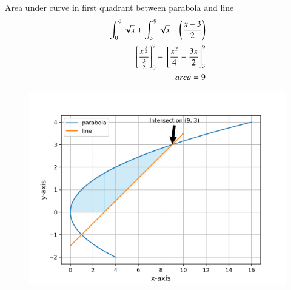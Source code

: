 \documentclass[a5paper,10pt]{article}
\begin{document}
Area under curve in first quadrant between parabola and line
\begin{align}
    \int_0^{3}\sqrt{x}+\int_3^{9}\sqrt{x}-\left(\frac{x-3}{2}\right)\\
    {}\left[\frac{x^{\frac{3}{2}}}{\frac{3}{2}}\right]^9_0-{}\left[\frac{x^2}{4}-\frac{3x}{2}\right]^9_3\\
    area=9
\end{align}
\begin{figure}[H]
    \centering
    \includegraphics[width=\columnwidth]{figs/figure.png}
    \caption{}
    \label{fig:placeholder}
\end{figure}
\end{document}
